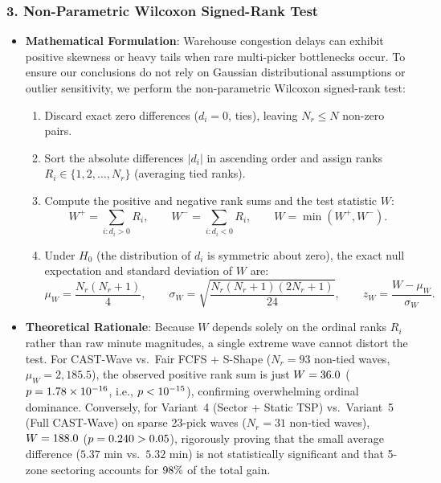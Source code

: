 \documentclass[11pt,a4paper]{article}
\begin{document}
\subsubsection{3. Non-Parametric Wilcoxon Signed-Rank Test}
\begin{itemize}[leftmargin=*]
    \item \textbf{Mathematical Formulation}: Warehouse congestion delays can exhibit positive skewness or heavy tails when rare multi-picker bottlenecks occur. To ensure our conclusions do not rely on Gaussian distributional assumptions or outlier sensitivity, we perform the non-parametric Wilcoxon signed-rank test:
    \begin{enumerate}
        \item Discard exact zero differences ($d_i = 0$, ties), leaving $N_r \le N$ non-zero pairs.
        \item Sort the absolute differences $|d_i|$ in ascending order and assign ranks $R_i \in \{1, 2, \dots, N_r\}$ (averaging tied ranks).
        \item Compute the positive and negative rank sums and the test statistic $W$:
        \begin{equation}
            W^+ = \sum_{i: d_i > 0} R_i, \qquad W^- = \sum_{i: d_i < 0} R_i, \qquad W = \min(W^+, W^-).
        \end{equation}
        \item Under $H_0$ (the distribution of $d_i$ is symmetric about zero), the exact null expectation and standard deviation of $W$ are:
        \begin{equation}
            \mu_W = \frac{N_r(N_r + 1)}{4}, \qquad \sigma_W = \sqrt{\frac{N_r(N_r + 1)(2N_r + 1)}{24}}, \qquad z_W = \frac{W - \mu_W}{\sigma_W}.
        \end{equation}
    \end{enumerate}
    \item \textbf{Theoretical Rationale}: Because $W$ depends solely on the ordinal ranks $R_i$ rather than raw minute magnitudes, a single extreme wave cannot distort the test. For CAST-Wave vs.\ Fair FCFS + S-Shape ($N_r = 93$ non-tied waves, $\mu_W = 2{,}185.5$), the observed positive rank sum is just $W = 36.0$ ($p = 1.78 \times 10^{-16}$, i.e., $p < 10^{-15}$), confirming overwhelming ordinal dominance. Conversely, for Variant~4 (Sector + Static TSP) vs.\ Variant~5 (Full CAST-Wave) on sparse 23-pick waves ($N_r = 31$ non-tied waves), $W = 188.0$ ($p = 0.240 > 0.05$), rigorously proving that the small average difference ($5.37\text{ min}$ vs.\ $5.32\text{ min}$) is not statistically significant and that 5-zone sectoring accounts for $98\%$ of the total gain.
\end{itemize}
\end{document}
